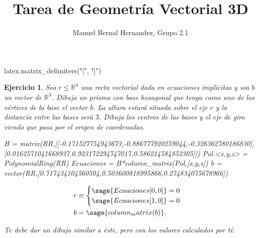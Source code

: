 \documentclass{amsart}
\title{Tarea de Geometría Vectorial 3D}
\author{Manuel Bernal Hernandez, Grupo 2.1}
\newtheorem{ejer}{Ejercicio}
\def\r{\mathbb{R}}
\begin{document}
\begin{sagecode}
latex.matrix_delimiters("[", "]")
\end{sagecode}

\maketitle

\begin{ejer}
Sea $r \leq \r^3$ una recta vectorial dada en ecuaciones implícitas
y sea $b$ un vector de $\r^3$. Dibuja un prisma con base hexagonal
que tenga como uno de los vértices de la base el vector $b$. La altura
estará situada sobre el eje $r$ y la distancia entre las bases será $3$. 
Dibuja los centros de las bases y el eje de giro viendo que pasa por el origen 
de coordenadas.

\begin{tcolorbox}[title = Datos]
\begin{sageblock}
H = matrix(RR,[[-0.171527754943673,-0.886777920259044,-0.326362780186830],
[0.0162571041668937,0.923172294747017,0.586214584852305]])
Pol.<x,y,z> = PolynomialRing(RR)
Ecuaciones = H*column_matrix(Pol,[x,y,z])
b = vector(RR,[0.717434104560504,0.503600818995866,0.274834075678966])
\end{sageblock}

\begin{align*}
r &\equiv \begin{cases} 
  \sage{Ecuaciones[0,0]} = 0 \\
  \sage{Ecuaciones[1,0]} = 0 \\
  \end{cases} \\
b &= \sage{column_matrix(b)}.
\end{align*}
\end{tcolorbox}

Te debe dar un dibujo similar a éste, pero con los valores calculados por tí:


\end{ejer}
\end{document}
